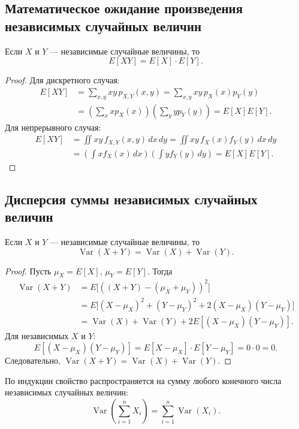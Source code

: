 \documentclass[10pt]{article}
\begin{document}
\subsection*{Математическое ожидание произведения независимых случайных величин}
\begin{theorem}
Если $X$ и $Y$ — независимые случайные величины, то
\[
E[XY] = E[X] \cdot E[Y].
\]
\end{theorem}
\begin{proof}
Для дискретного случая:
\begin{align*}
    E[XY] &= \sum_{x,y} xy\, p_{X,Y}(x,y) = \sum_{x,y} xy\, p_X(x)p_Y(y) \\
    &= \left(\sum_x x p_X(x)\right)\left(\sum_y y p_Y(y)\right) = E[X]E[Y].
\end{align*}
Для непрерывного случая:
\begin{align*}
E[XY] &= \iint xy\, f_{X,Y}(x,y)\,dx\,dy = \iint xy\, f_X(x)f_Y(y)\,dx\,dy \\
&= \left(\int x f_X(x)\,dx\right)\left(\int y f_Y(y)\,dy\right) = E[X]E[Y].
\end{align*}
\end{proof}

\subsection*{Дисперсия суммы независимых случайных величин}
\begin{theorem}
Если $X$ и $Y$ — независимые случайные величины, то
\[
\operatorname{Var}(X+Y) = \operatorname{Var}(X) + \operatorname{Var}(Y).
\]
\end{theorem}
\begin{proof}
Пусть $\mu_X = E[X]$, $\mu_Y = E[Y]$. Тогда
\[
\begin{aligned}
\operatorname{Var}(X+Y) &= E\bigl[((X+Y) - (\mu_X+\mu_Y))^2\bigr] \\
&= E\bigl[(X-\mu_X)^2 + (Y-\mu_Y)^2 + 2(X-\mu_X)(Y-\mu_Y)\bigr] \\
&= \operatorname{Var}(X) + \operatorname{Var}(Y) + 2E[(X-\mu_X)(Y-\mu_Y)].
\end{aligned}
\]
Для независимых $X$ и $Y$:
\[
E[(X-\mu_X)(Y-\mu_Y)] = E[X-\mu_X] \cdot E[Y-\mu_Y] = 0 \cdot 0 = 0.
\]
Следовательно, $\operatorname{Var}(X+Y) = \operatorname{Var}(X) + \operatorname{Var}(Y)$.
\end{proof}
По индукции свойство распространяется на сумму любого конечного числа независимых случайных величин:
\[
\operatorname{Var}\left(\sum_{i=1}^n X_i\right) = \sum_{i=1}^n \operatorname{Var}(X_i).
\]
\end{document}
